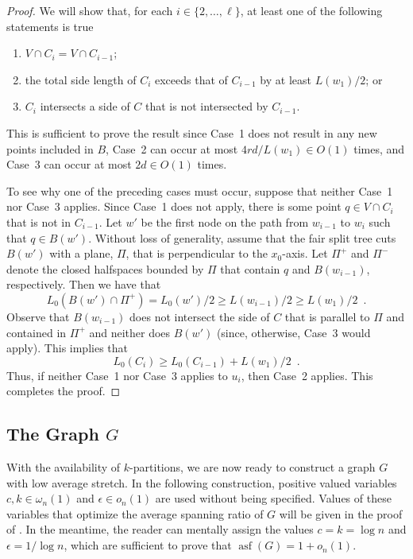 \documentclass{patmorin}
\DeclareMathOperator{\asf}{asf}
\begin{document}
\begin{proof}
  We will show that, for each $i\in\{2,\ldots,\ell\}$, at least one of
  the following statements is true
  \begin{enumerate}
    \item $V\cap C_i = V\cap C_{i-1}$; 
    \item the total side length of $C_i$ exceeds that of $C_{i-1}$ by at least
      $L(w_1)/2$; or
    \item $C_i$ intersects a side of $C$ that is not intersected by $C_{i-1}$.
  \end{enumerate}
  This is sufficient to prove the result since Case~1 does not result in
  any new points included in $B$, Case~2 can occur at most $4rd/L(w_1)\in
  O(1)$ times, and Case~3 can occur at most $2d\in O(1)$ times.

  To see why one of the preceding cases must occur, suppose that neither
  Case~1 nor Case~3 applies.  Since Case~1 does not apply, there is
  some point $q\in V\cap C_i$ that is not in $C_{i-1}$.  Let $w'$ be the
  first node on the path from $w_{i-1}$ to $w_i$ such that $q\in B(w')$.
  Without loss of generality, assume that the fair split tree cuts
  $B(w')$ with a plane, $\Pi$, that is perpendicular to the $x_0$-axis.
  Let $\Pi^+$ and $\Pi^-$ denote the closed halfspaces bounded by $\Pi$
  that contain $q$ and $B(w_{i-1})$, respectively.  Then we have that
  \[
      L_0(B(w')\cap \Pi^+) = L_0(w')/2 \ge L(w_{i-1})/2 \ge L(w_{1})/2  \enspace .
  \]
  Observe that $B(w_{i-1})$ does not intersect the side of $C$ that is
  parallel to $\Pi$ and contained in $\Pi^+$ and neither does $B(w')$
  (since, otherwise, Case~3 would apply).  This implies that
  \[
      L_0(C_i) \ge L_0(C_{i-1}) + L(w_1)/2 \enspace .
  \] 
  Thus, if neither Case~1 nor Case~3 applies to $u_i$, then Case~2
  applies.  This completes the proof.
\end{proof}

\subsection{The Graph $G$}

With the availability of $k$-partitions, we are now ready to construct
a graph $G$ with low average stretch.  In the following construction,
positive valued variables $c,k\in\omega_n(1)$ and $\epsilon\in o_n(1)$
are used without being specified.  Values of these variables that
optimize the average spanning ratio of $G$ will be given in the proof
of .  In the meantime, the reader can mentally assign the
values $c=k=\log n$ and $\epsilon = 1/\log n$, which are sufficient to
prove that $\asf(G)=1+o_n(1)$.
\end{document}
